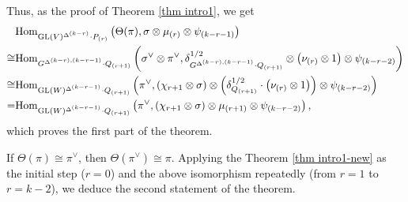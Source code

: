 \documentclass[11pt,reqno]{amsart}
\renewcommand{\1}{{\mathbf{1}}} \newcommand{\sB}{{\mathscr{B}}}
\newcommand{\GL}{{\mathrm{GL}}}\newcommand{\G}{{\mathrm{G}}}
\theoremstyle{plain}
\theoremstyle{definition}
\numberwithin{equation}{section}
\begin{document}
Thus, as the proof of Theorem \ref{thm intro1}, we get
$$\begin{aligned}&\Hom_{\GL(V)^{\Delta^{(k-r)}}\cdot P_{(r)}}\left(\Theta(\pi),\sigma\otimes\mu_{(r)}\otimes\psi_{(k-r-1)}\right)\\
\cong& \Hom_{G^{\Delta^{(k-r),(k-r-1)}}\cdot Q_{(r+1)}}\left(\sigma^\vee\otimes\pi^\vee,\delta^{1/2}_{G^{\Delta^{(k-r),(k-r-1)}}\cdot Q_{(r+1)}}\otimes\left(\nu_{(r)}\otimes1\right)\otimes\psi_{(k-r-2)}\right)\\
\cong& \Hom_{\GL(W)^{\Delta^{(k-r-1)}}\cdot Q_{(r+1)}}\left(\pi^\vee,\left(\chi_{r+1}\otimes\sigma\right)\otimes\left(\delta^{1/2}_{Q_{(r+1)}}\cdot\left(\nu_{(r)}\otimes1\right)\right)\otimes\psi_{(k-r-2)}\right)\\
=& \Hom_{\GL(W)^{\Delta^{(k-r-1)}}\cdot Q_{(r+1)}}\left(\pi^\vee,\left(\chi_{r+1}\otimes\sigma\right)\otimes\mu_{(r+1)}\otimes\psi_{(k-r-2)}\right),
\end{aligned}$$
which proves the first part of the theorem.

If $\Theta(\pi)\cong\pi^\vee$, then $\Theta(\pi^\vee)\cong\pi$. Applying the Theorem \ref{thm intro1-new} as the initial step ($r=0$) and the above isomorphism repeatedly (from $r=1$ to $r=k-2$), 
we deduce 
the second statement of the theorem.
\end{document}
